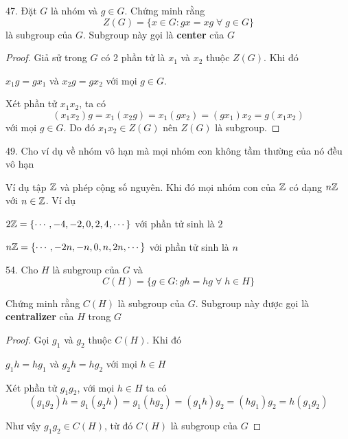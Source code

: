 47. Đặt $G$ là nhóm và $g \in G$. Chứng minh rằng $$Z(G) = \{ x \in G: gx = xg \; \forall \; g \in G \}$$ là subgroup của $G$. Subgroup này gọi là \textbf{center} của $G$

\begin{proof}
    Giả sử trong $G$ có 2 phần tử là $x_1$ và $x_2$ thuộc $Z(G)$. Khi đó

        $x_1 g = g x_1$ và $x_2 g = g x_2$ với mọi $g \in G$.

    Xét phần tử $x_1 x_2$, ta có
    $$(x_1 x_2) g = x_1 (x_2 g) = x_1 (g x_2) = (g x_1) x_2 = g (x_1 x_2)$$ với mọi $g \in G$. Do đó $x_1 x_2 \in Z(G)$ nên $Z(G)$ là subgroup.

\end{proof}

49. Cho ví dụ về nhóm vô hạn mà mọi nhóm con không tầm thường của nó đều vô hạn

Ví dụ tập $\mathbb{Z}$ và phép cộng số nguyên. Khi đó mọi nhóm con của $\mathbb{Z}$ có dạng $n\mathbb{Z}$ với $n \in \mathbb{Z}$. Ví dụ

$2\mathbb{Z} = \{\cdots, -4, -2, 0, 2, 4, \cdots\}$ với phần tử sinh là $2$

$n\mathbb{Z} = \{\cdots, -2n, -n, 0, n, 2n, \cdots\}$ với phần tử sinh là $n$

54. Cho $H$ là subgroup của $G$ và $$C(H) = \{g \in G: gh = hg \; \forall \; h \in H\}$$

Chứng minh rằng $C(H)$ là subgroup của $G$. Subgroup này được gọi là \textbf{centralizer} của $H$ trong $G$

\begin{proof}
    Gọi $g_1$ và $g_2$ thuộc $C(H)$. Khi đó

    $g_1 h = h g_1$ và $g_2 h = h g_2$ với mọi $h \in H$

    Xét phần tử $g_1 g_2$, với mọi $h \in H$ ta có
    $$(g_1 g_2) h = g_1 (g_2 h) = g_1 (h g_2) = (g_1 h) g_2 = (h g_1) g_2 = h (g_1 g_2)$$

    Như vậy $g_1 g_2 \in C(H)$, từ đó $C(H)$ là subgroup của $G$


\end{proof}